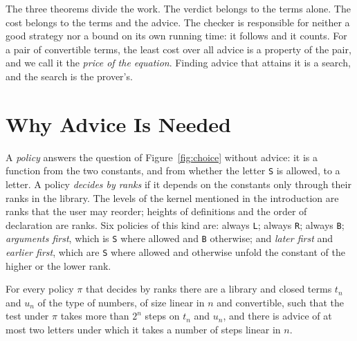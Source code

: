\documentclass[acmsmall,nonacm,screen]{acmart}
\newcommand{\adv}[1]{\textup{\texttt{#1}}}
\begin{document}
The three theorems divide the work. The verdict belongs to the terms alone. The cost belongs
to the terms and the advice. The checker is responsible for neither a good strategy nor a
bound on its own running time: it follows and it counts. For a pair of convertible terms,
the least cost over all advice is a property of the pair, and we call it the \emph{price of
the equation}. Finding advice that attains it is a search, and the search is the prover's.

\section{Why Advice Is Needed}
\label{sec:need}

A \emph{policy} answers the question of Figure~\ref{fig:choice} without advice: it is a
function from the two constants, and from whether the letter \adv{S} is allowed, to a letter.
A policy \emph{decides by ranks} if it depends on the constants only through their ranks in
the library. The levels of the kernel mentioned in the introduction are ranks that the user
may reorder; heights of definitions and the order of declaration are ranks. Six policies of
this kind are: always \adv{L}; always \adv{R}; always \adv{B}; \emph{arguments first}, which
is \adv{S} where allowed and \adv{B} otherwise; and \emph{later first} and \emph{earlier
first}, which are \adv{S} where allowed and otherwise unfold the constant of the higher or
the lower rank.

\begin{theorem}
\label{thm:adversary}
For every policy $\pi$ that decides by ranks there are a library and closed terms $t_n$ and
$u_n$ of the type of numbers, of size linear in $n$ and convertible, such that the test under
$\pi$ takes more than $2^n$ steps on $t_n$ and $u_n$, and there is advice of at most two
letters under which it takes a number of steps linear in $n$.
\end{theorem}
\end{document}
